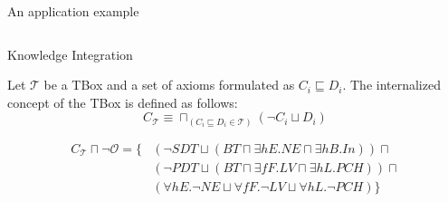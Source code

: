 \documentclass{beamer}
\begin{document}
\begin{frame}{An application example}
\begin{exampleblock}{}
\begin{columns}
\begin{column}{.4\textwidth}
\end{column}
\end{columns}

% 
\end{exampleblock}
%  
\end{frame}


\begin{frame}{Knowledge Integration}
\begin{defn}
Let $\mathcal{T}$ be a TBox and a set of axioms formulated as $C_i \sqsubseteq D_i$. The internalized concept of the TBox is defined as follows:
$$C_\mathcal{T} \equiv \sqcap_{(C_i \sqsubseteq D_i\in \mathcal{T})} (\neg C_i \sqcup D_i) $$
\label{def:ic}
\end{defn}
 \begin{align*}
 C_\mathcal{T}\sqcap  \neg\mathcal{O}= \{ &(\neg SDT \sqcup (BT \sqcap \exists hE. NE \sqcap \exists hB. In)) \sqcap \\
 &(\neg PDT \sqcup ( BT \sqcap \exists fF. LV \sqcap \exists hL. PCH)) \sqcap \\
 &(\forall hE. \neg NE \sqcup \forall fF. \neg LV \sqcup \forall hL.\neg PCH )\}
\end{align*}
\end{frame}








\end{document}
